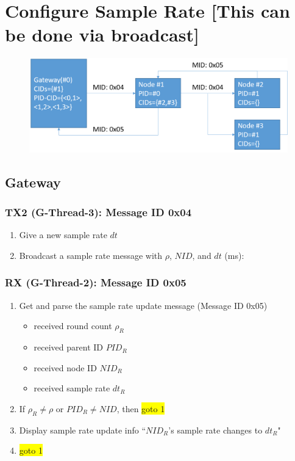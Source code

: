 \documentclass[letterpaper,9pt]{article}
\begin{document}
\newpage
\section{Configure Sample Rate [This can be done via broadcast]}

\begin{figure}[!h]
	\centering
	\includegraphics[width=12cm]{./img/samplerate.png}
\end{figure}

\subsection{Gateway}

\subsubsection{TX2 (G-Thread-3): Message ID 0x04}

\begin{enumerate}
	\item Give a new sample rate $dt$
		\item Broadcast a sample rate message with $\rho$, $NID$, and $dt$ (ms):\\
\end{enumerate}

\subsubsection{RX (G-Thread-2): Message ID 0x05}

\begin{enumerate}
	\item Get and parse the sample rate update message (Message ID 0x05)
	\begin{itemize}
		\item received round count $\rho_R$
		\item received parent ID $PID_R$
		\item received node ID $NID_R$
		\item received sample rate $dt_R$
	\end{itemize}
		\item If $\rho_R \neq \rho$ or $PID_R \neq NID$, then \colorbox{yellow}{goto 1}
		\item Display sample rate update info ``$NID_R$'s sample rate changes to $dt_R$"
	\item \colorbox{yellow}{goto 1}
\end{enumerate}
\end{document}
